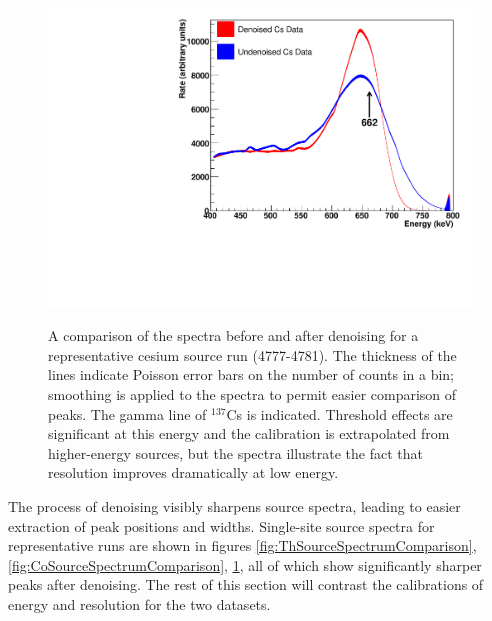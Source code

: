 \begin{figure}
\begin{center}
\includegraphics[keepaspectratio=true,width=\textwidth]{CsSourceSpectrumComparison.pdf}
\end{center}
\renewcommand{\baselinestretch}{1}
\small\normalsize
\begin{quote}
\caption{A comparison of the spectra before and after denoising for a representative cesium source run (4777-4781).  The thickness of the lines indicate Poisson error bars on the number of counts in a bin; smoothing is applied to the spectra to permit easier comparison of peaks.  The gamma line of $^{137}$Cs is indicated.  Threshold effects are significant at this energy and the calibration is extrapolated from higher-energy sources, but the spectra illustrate the fact that resolution improves dramatically at low energy.}
\label{fig:CsSourceSpectrumComparison}
\end{quote}
\end{figure}
\renewcommand{\baselinestretch}{2}
\small\normalsize

The process of denoising visibly sharpens source spectra, leading to easier extraction of peak positions and widths.  Single-site source spectra for representative runs are shown in figures \ref{fig:ThSourceSpectrumComparison}, \ref{fig:CoSourceSpectrumComparison}, \ref{fig:CsSourceSpectrumComparison}, all of which show significantly sharper peaks after denoising.  The rest of this section will contrast the calibrations of energy and resolution for the two datasets.

